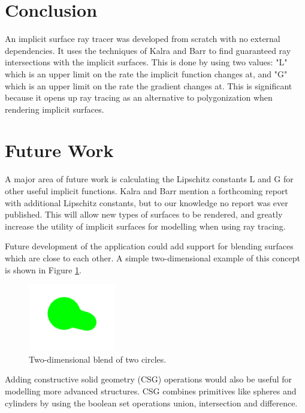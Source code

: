 \documentclass[conference]{acmsiggraph}
\begin{document}
\section{Conclusion}

An implicit surface ray tracer was developed from scratch with no external
dependencies.  It uses the techniques of Kalra and Barr \cite{KalraBarr1989}
to find guaranteed ray intersections with the implicit surfaces.  This is done
by using two values: "L" which is an upper limit on the rate the implicit
function changes at, and "G" which is an upper limit on the rate the gradient
changes at.  This is significant because it opens up ray tracing as an 
alternative to polygonization when rendering implicit surfaces.

\section{Future Work}

A major area of future work is calculating the Lipschitz constants L and G
for other useful implicit functions.  Kalra and Barr \cite{KalraBarr1989} 
mention a forthcoming report with additional Lipschitz constants, but to
our knowledge no report was ever published.  This will allow new types of
surfaces to be rendered, and greatly increase the utility of implicit 
surfaces for modelling when using ray tracing.

Future development of the application could add support for blending surfaces
which are close to each other.  A simple two-dimensional example of this concept
is shown in Figure \ref{fig:blend2d}.

\begin{figure}[ht]
  \centering
  \includegraphics[width=1.5in]{figures/blend2d.png}
  \caption{Two-dimensional blend of two circles.}
  \label{fig:blend2d}
\end{figure}

Adding constructive solid geometry (CSG) operations would also be useful
for modelling more advanced structures.  CSG combines primitives like 
spheres and cylinders by using the boolean set operations union,
intersection and difference.



\end{document}
